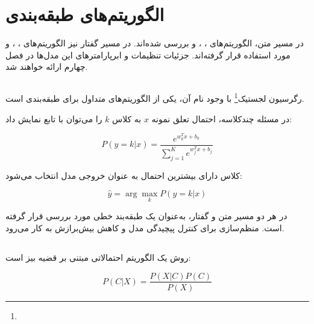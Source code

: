 \documentclass[12pt,a4paper,oneside]{report}
\begin{document}
\section{الگوریتم‌های طبقه‌بندی}

در مسیر متن، الگوریتم‌های
،
،
و
بررسی شده‌اند. در مسیر گفتار نیز الگوریتم‌های
،
،
و
مورد استفاده قرار گرفته‌اند. جزئیات تنظیمات و ابرپارامترهای این مدل‌ها در فصل چهارم ارائه خواهند شد.


\subsection{}

رگرسیون لجستیک\footnote{} با وجود نام آن، یکی از الگوریتم‌های متداول برای طبقه‌بندی است.

در مسئله چندکلاسه، احتمال تعلق نمونه $x$ به کلاس $k$ را می‌توان با تابع
نمایش داد:

\begin{equation}
P(y=k|x)
=
\frac{
e^{w_k^Tx+b_k}
}{
\sum_{j=1}^{K}
e^{w_j^Tx+b_j}
}
\end{equation}

کلاس دارای بیشترین احتمال به عنوان خروجی مدل انتخاب می‌شود:

\begin{equation}
\hat{y}
=
\arg\max_k
P(y=k|x)
\end{equation}

در هر دو مسیر متن و گفتار،
به‌عنوان یک طبقه‌بند خطی مورد بررسی قرار گرفته است. منظم‌سازی برای کنترل پیچیدگی مدل و کاهش بیش‌برازش به کار می‌رود.


\subsection{}

روش
یک الگوریتم احتمالاتی مبتنی بر قضیه بیز است:

\begin{equation}
P(C|X)
=
\frac{
P(X|C)P(C)
}{
P(X)
}
\end{equation}
\end{document}
